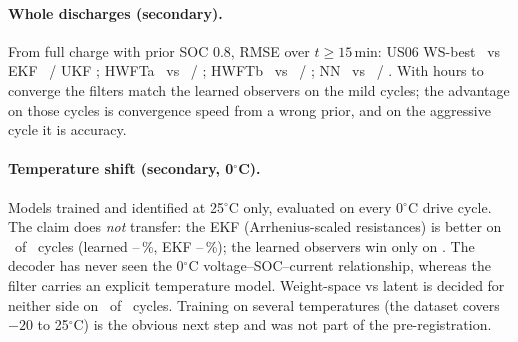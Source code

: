 \paragraph{Whole discharges (secondary).} From full charge with prior SOC 0.8, RMSE over $t\ge15$\,min: US06 WS-best \RealWholeWsBestUSZeroSix\ vs EKF \RealWholeEkfUSZeroSix\ / UKF \RealWholeUkfUSZeroSix; HWFTa \RealWholeWsBestHWFTa\ vs \RealWholeEkfHWFTa\ / \RealWholeUkfHWFTa; HWFTb \RealWholeWsBestHWFTb\ vs \RealWholeEkfHWFTb\ / \RealWholeUkfHWFTb; NN \RealWholeWsBestNN\ vs \RealWholeEkfNN\ / \RealWholeUkfNN. With hours to converge the filters match the learned observers on the mild cycles; the advantage on those cycles is convergence speed from a wrong prior, and on the aggressive cycle it is accuracy.

\paragraph{Temperature shift (secondary, 0$^\circ$C).} Models trained and identified at 25$^\circ$C only, evaluated on every 0$^\circ$C drive cycle. The claim does \emph{not} transfer: the EKF (Arrhenius-scaled resistances) is better on \RealZeroEkfBetter\ of \RealZeroNCycles\ cycles (learned \RealZeroWsRmseMin--\RealZeroWsRmseMax\,\%, EKF \RealZeroEkfRmseMin--\RealZeroEkfRmseMax\,\%); the learned observers win only on \RealZeroWsBetterCycles. The decoder has never seen the 0$^\circ$C voltage--SOC--current relationship, whereas the filter carries an explicit temperature model. Weight-space vs latent is decided for neither side on \RealZeroWsLatentTies\ of \RealZeroNCycles\ cycles. Training on several temperatures (the dataset covers $-20$ to 25$^\circ$C) is the obvious next step and was not part of the pre-registration.

